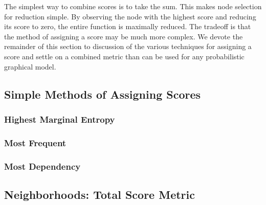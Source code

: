 The simplest way to combine scores is to take the sum.  This makes node selection for reduction simple.  By observing the node with the highest score and reducing its score to zero, the entire function is maximally reduced.  The tradeoff is that the method of assigning a score may be much more complex.  We devote the remainder of this section to discussion of the various techniques for assigning a score and settle on a combined metric than can be used for any probabilistic graphical model.

\subsection{Simple Methods of Assigning Scores}
\subsubsection{Highest Marginal Entropy}
\subsubsection{Most Frequent}
\subsubsection{Most Dependency}
\subsection{Neighborhoods: Total Score Metric}
